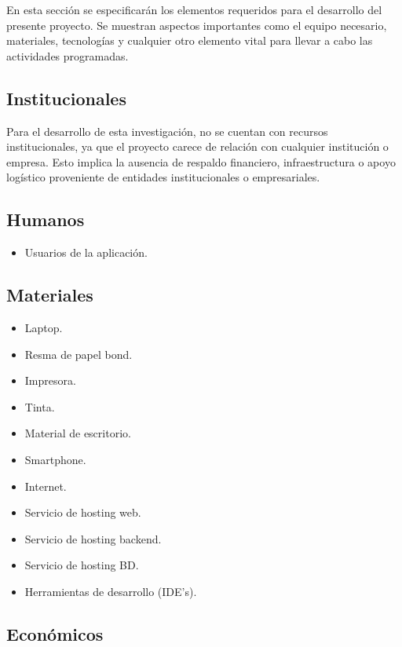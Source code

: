 En esta sección se especificarán los elementos requeridos para el desarrollo del presente proyecto.
Se muestran aspectos importantes como el equipo necesario, materiales, tecnologías y cualquier otro
elemento vital para llevar a cabo las actividades programadas.
\subsection{Institucionales}
Para el desarrollo de esta investigación, no se cuentan con recursos institucionales, ya que el proyecto
carece de relación con cualquier institución o empresa. Esto implica la ausencia de respaldo financiero,
infraestructura o apoyo logístico proveniente de entidades institucionales o empresariales.

\subsection{Humanos}
\begin{itemize}
    \item Usuarios de la aplicación.
\end{itemize}

\subsection{Materiales}
\begin{itemize}
    \item Laptop.
    \item Resma de papel bond.
    \item Impresora.
    \item Tinta.
    \item Material de escritorio.
    \item Smartphone.
    \item Internet.
    \item Servicio de hosting web.
    \item Servicio de hosting backend.
    \item Servicio de hosting BD.
    \item Herramientas de desarrollo (IDE's).
\end{itemize}
\newpage
\subsection{Económicos}

